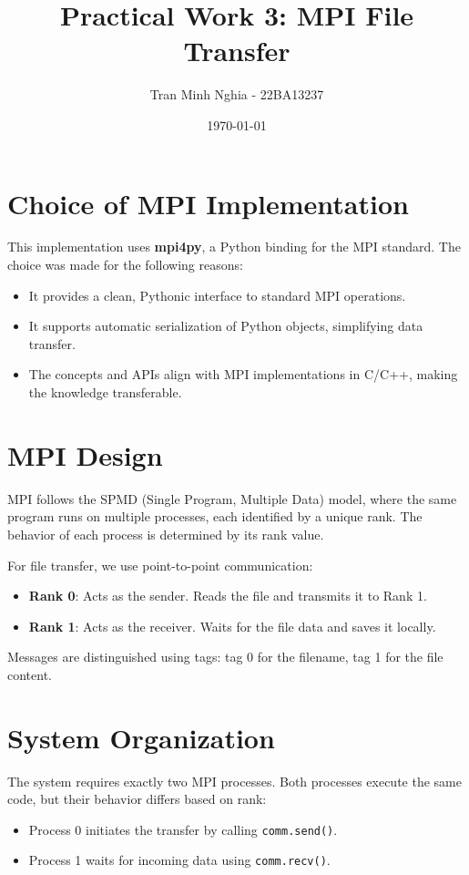 \documentclass{article}
\title{Practical Work 3: MPI File Transfer}
\author{Tran Minh Nghia - 22BA13237}
\date{\today}
\begin{document}
\maketitle

\section{Choice of MPI Implementation}
This implementation uses \textbf{mpi4py}, a Python binding for the MPI standard. The choice was made for the following reasons:
\begin{itemize}
    \item It provides a clean, Pythonic interface to standard MPI operations.
    \item It supports automatic serialization of Python objects, simplifying data transfer.
    \item The concepts and APIs align with MPI implementations in C/C++, making the knowledge transferable.
\end{itemize}

\section{MPI Design}
MPI follows the SPMD (Single Program, Multiple Data) model, where the same program runs on multiple processes, each identified by a unique rank. The behavior of each process is determined by its rank value.

For file transfer, we use point-to-point communication:
\begin{itemize}
    \item \textbf{Rank 0}: Acts as the sender. Reads the file and transmits it to Rank 1.
    \item \textbf{Rank 1}: Acts as the receiver. Waits for the file data and saves it locally.
\end{itemize}

Messages are distinguished using tags: tag 0 for the filename, tag 1 for the file content.

\section{System Organization}
The system requires exactly two MPI processes. Both processes execute the same code, but their behavior differs based on rank:
\begin{itemize}
    \item Process 0 initiates the transfer by calling \texttt{comm.send()}.
    \item Process 1 waits for incoming data using \texttt{comm.recv()}.
\end{itemize}
\end{document}
